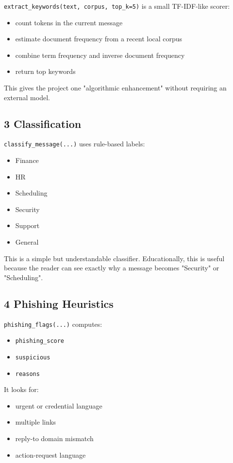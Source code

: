 \documentclass[11pt,a4paper]{article}
\begin{document}
\nolinkurl{extract_keywords(text, corpus, top_k=5)} is a small TF-IDF-like scorer:

\begin{itemize}
\item count tokens in the current message
\item estimate document frequency from a recent local corpus
\item combine term frequency and inverse document frequency
\item return top keywords
\end{itemize}

This gives the project one "algorithmic enhancement" without requiring an external model.

\subsection{3 Classification}

\nolinkurl{classify_message(...)} uses rule-based labels:

\begin{itemize}
\item Finance
\item HR
\item Scheduling
\item Security
\item Support
\item General
\end{itemize}

This is a simple but understandable classifier. Educationally, this is useful because the reader can see exactly why a message becomes "Security" or "Scheduling".

\subsection{4 Phishing Heuristics}

\nolinkurl{phishing_flags(...)} computes:

\begin{itemize}
\item \nolinkurl{phishing_score}
\item \nolinkurl{suspicious}
\item \nolinkurl{reasons}
\end{itemize}

It looks for:

\begin{itemize}
\item urgent or credential language
\item multiple links
\item reply-to domain mismatch
\item action-request language
\end{itemize}
\end{document}
